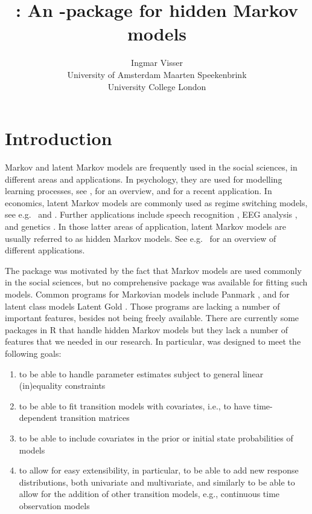 \documentclass[article]{jss}
\author{Ingmar Visser\\University of Amsterdam \And 
        Maarten Speekenbrink\\University College London}
\title{\pkg{depmixS4} : An \proglang{R}-package for hidden Markov models}
\begin{document}



\section{Introduction}

Markov and latent Markov models are frequently used in the social
sciences, in different areas and applications.  In psychology, they
are used for modelling learning processes, see \citet{Wickens1982},
for an overview, and \citet{Schmittmann2006} for a recent application.
In economics, latent Markov models are commonly used as regime
switching models, see e.g.\ \citet{Kim1994} and \citet{Ghysels1994}.
Further applications include speech recognition \citep{Rabiner1989},
EEG analysis \citep{Rainer2000}, and genetics \citep{Krogh1998}.  In
those latter areas of application, latent Markov models are usually
referred to as hidden Markov models. See e.g.\ \citet[][chapter~1]{Cappe2005}
for an overview of different applications. 

The  package was motivated by the fact that Markov
models are used commonly in the social sciences, but no comprehensive
package was available for fitting such models.  Common programs for
Markovian models include Panmark \citep{Pol1996}, and for latent class
models Latent Gold \citep{Vermunt2003}.  Those programs are lacking a
number of important features, besides not being freely available.
There are currently some packages in R that handle hidden Markov
models but they lack a number of features that we needed in our
research.  In particular,  was designed to meet the
following goals:

\begin{enumerate}
	
	\item to be able to handle parameter estimates subject to general
	linear (in)equality constraints
	
	\item to be able to fit transition models with covariates, i.e.,
	to have time-dependent transition matrices
	
	\item to be able to include covariates in the prior or initial
	state probabilities of models
	
	\item to allow for easy extensibility, in particular, to be able
	to add new response distributions, both univariate and
	multivariate, and similarly to be able to allow for the addition
	of other transition models, e.g., continuous time observation
	models
	
\end{enumerate}
\end{document}
